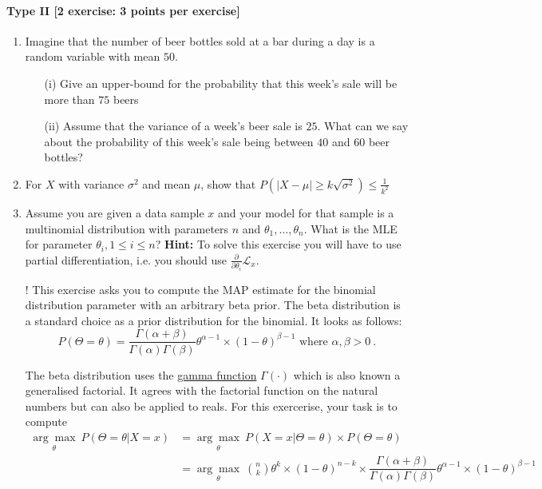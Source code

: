 \documentclass{article}
\begin{document}
\paragraph{Type II [2 exercise: 3 points per exercise]}
\begin{enumerate}
	\item Imagine that the number of beer bottles sold at a bar during a day is a random variable with mean $50$.
		\begin{itemize}
			\item[(i)] Give an upper-bound for the probability that this week's sale will be more than $75$ beers
			\item[(ii)] Assume that the variance of a week's beer sale is $25$. What can we say about the probability of this week's sale being between $40$ and $60$ beer bottles?
		\end{itemize}
	
	\item For $X$ with variance $\sigma^2$ and mean $\mu$, show that $P(|X-\mu| \geq k\sqrt{\sigma^2}) \leq \frac{1}{k^2}$
	
	\item Assume you are given a data sample $ x $ and your model for that sample is a multinomial distribution with parameters $ n $ and 
	$ \theta_{1}, \ldots, \theta_{n} $. What is the MLE for parameter $ \theta_{i}, 1 \leq i \leq n $? \textbf{Hint:} To solve this exercise you will
	have to use partial differentiation, i.e. you should use $ \frac{\partial}{\partial\theta_{i}}\mathcal{L}_{x} $.
	\item[\arabic{enumi}!] This exercise asks you to compute the MAP estimate for the binomial distribution parameter with an arbitrary beta prior. The beta distribution
	is a standard choice as a prior distribution for the binomial. It looks as follows:
	\begin{equation*}
	P(\Theta=\theta) = \dfrac{\Gamma(\alpha + \beta)}{\Gamma(\alpha)\Gamma(\beta)}\theta^{\alpha-1} \times (1-\theta)^{\beta-1} \mbox{ where } \alpha, \beta > 0 \ .
	\end{equation*}
	
	The beta distribution uses the \href{https://en.wikipedia.org/wiki/Gamma_function}{gamma function} $ \Gamma(\cdot) $ which is also known a generalised factorial.
	It agrees with the factorial function on the natural numbers but can also be applied to reals.	
	For this exercerise, your task is to compute
	\begin{align*}
	\underset{\theta}{\arg\max}~P(\Theta=\theta|X=x) &= \underset{\theta}{\arg\max}~P(X =x |\Theta = \theta) \times P(\Theta = \theta) \\
	&= \underset{\theta}{\arg\max}~\binom{n}{k}\theta^{k}\times (1-\theta)^{n-k} \times \dfrac{\Gamma(\alpha + \beta)}{\Gamma(\alpha)\Gamma(\beta)}\theta^{\alpha-1} \times (1-\theta)^{\beta-1}
	\end{align*}
\end{enumerate}
\end{document}
